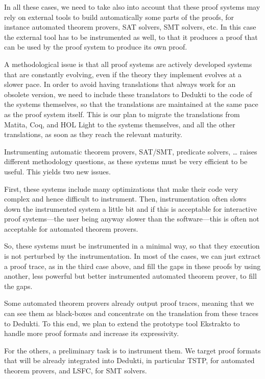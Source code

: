 In all these cases, we need to take also into account that these proof
systems may rely on external tools to build automatically some parts
of the proofs, for instance automated theorem provers, SAT solvers,
SMT solvers, etc. In this case the external tool has to be
instrumented as well, to that it produces a proof that can be used by
the proof system to produce its own proof.

A methodological issue is that all proof systems are actively
developed systems that are constantly evolving, even if the theory
they implement evolves at a slower pace. In order to avoid having
translations that always work for an obsolete version, we need to
include these translators to Dedukti to the code of the systems
themselves, so that the translations are maintained at the same pace
as the proof system itself. This is our plan to migrate the
translations from Matita, Coq, and HOL Light to the systems
themselves, and all the other translations, as soon as they reach the
relevant maturity.


Instrumenting automatic theorem provers, SAT/SMT, predicate solvers,
\dots
raises different methodology questions, as these systems
must be very efficient to be useful. This yields two new issues.

First, these systems include many optimizations that make their code
very complex and hence difficult to instrument. Then, instrumentation
often slows down the instrumented system a little bit and if this is
acceptable for interactive proof systems---the user being anyway
slower than the software---this is often not acceptable for automated
theorem provers.

So, these systems must be instrumented in a minimal way, so that they
execution is not perturbed by the instrumentation. In most of the
cases, we can just extract a proof trace, as in the third case above,
and fill the gaps in these proofs by using another, less powerful but better
instrumented automated theorem prover, to fill the gaps.

Some automated theorem provers already output proof traces, meaning
that we can see them as black-boxes and concentrate on the translation
from these traces to Dedukti. To this end, we plan to extend the
prototype tool Ekstrakto to handle more proof formats and increase its
expressivity.

For the others, a preliminary task is to instrument them.  We target
proof formats that will be already integrated into Dedukti, in
particular TSTP, for automated theorem provers, and LSFC, for SMT solvers.

